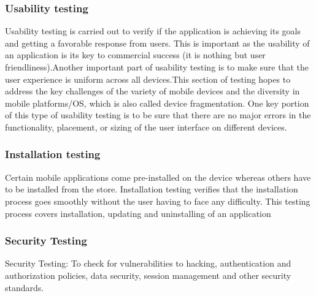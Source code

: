 \documentclass[BTech]{srmuthesis}
\begin{document}
\subsubsection{Usability testing}
Usability testing is carried out to verify if the application is achieving its goals and getting a favorable response from users. This is important as the usability of an application is its key to commercial success (it is nothing but user friendliness).Another important part of usability testing is to make sure that the user experience is uniform across all devices.This section of testing hopes to address the key challenges of the variety of mobile devices and the diversity in mobile platforms/OS, which is also called device fragmentation. One key portion of this type of usability testing is to be sure that there are no major errors in the functionality, placement, or sizing of the user interface on different devices.
\subsubsection{Installation testing}
Certain mobile applications come pre-installed on the device whereas others have to be installed from the store. Installation testing verifies that the installation process goes smoothly without the user having to face any difficulty. This testing process covers installation, updating and uninstalling of an application
\subsubsection{Security Testing}
Security Testing: To check for vulnerabilities to hacking, authentication and authorization policies, data security, session management and other security standards.
\end{document}
